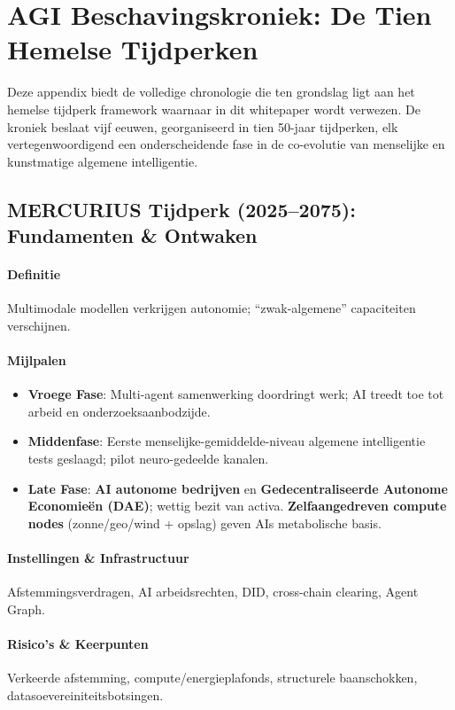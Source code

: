 \documentclass[11pt]{article}
\begin{document}
\appendix
\newpage

\section{AGI Beschavingskroniek: De Tien Hemelse Tijdperken}
\label{appendix:chronicle}

Deze appendix biedt de volledige chronologie die ten grondslag ligt aan het hemelse tijdperk framework waarnaar in dit whitepaper wordt verwezen. De kroniek beslaat vijf eeuwen, georganiseerd in tien 50-jaar tijdperken, elk vertegenwoordigend een onderscheidende fase in de co-evolutie van menselijke en kunstmatige algemene intelligentie.

\subsection{MERCURIUS Tijdperk (2025–2075): Fundamenten \& Ontwaken}
\paragraph{Definitie} Multimodale modellen verkrijgen autonomie; ``zwak-algemene'' capaciteiten verschijnen.

\paragraph{Mijlpalen}
\begin{itemize}[noitemsep]
  \item \textbf{Vroege Fase}: Multi-agent samenwerking doordringt werk; AI treedt toe tot arbeid en onderzoeksaanbodzijde.
  \item \textbf{Middenfase}: Eerste menselijke-gemiddelde-niveau algemene intelligentie tests geslaagd; pilot neuro-gedeelde kanalen.
  \item \textbf{Late Fase}: \textbf{AI autonome bedrijven} en \textbf{Gedecentraliseerde Autonome Economieën (DAE)}; wettig bezit van activa. \textbf{Zelfaangedreven compute nodes} (zonne/geo/wind + opslag) geven AIs metabolische basis.
\end{itemize}

\paragraph{Instellingen \& Infrastructuur} Afstemmingsverdragen, AI arbeidsrechten, DID, cross-chain clearing, Agent Graph.

\paragraph{Risico's \& Keerpunten} Verkeerde afstemming, compute/energieplafonds, structurele baanschokken, datasoevereiniteitsbotsingen.
\end{document}

